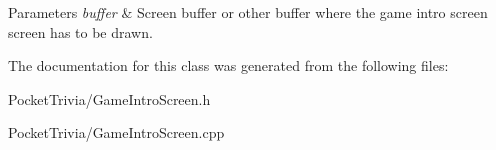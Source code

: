 \begin{DoxyParams}{Parameters}
{\em buffer} & Screen buffer or other buffer where the game intro screen screen has to be drawn. \\
\hline
\end{DoxyParams}


The documentation for this class was generated from the following files\+:\begin{DoxyCompactItemize}
\item 
Pocket\+Trivia/Game\+Intro\+Screen.\+h\item 
Pocket\+Trivia/Game\+Intro\+Screen.\+cpp\end{DoxyCompactItemize}
